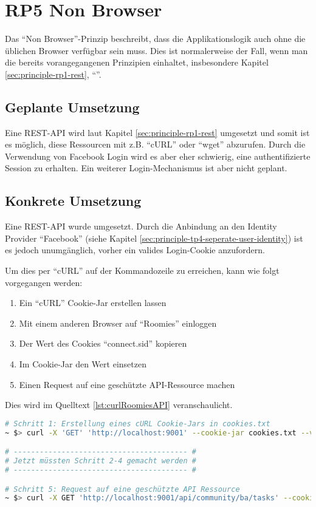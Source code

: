 \section{RP5 Non Browser}
\label{sec:principle-rp5-non-browser}

Das ``Non Browser''-Prinzip beschreibt, dass die Applikationslogik auch ohne die üblichen Browser verfügbar sein muss. Dies ist normalerweise der Fall, wenn man die bereits vorangegangenen Prinzipien einhaltet, insbesondere Kapitel \ref{sec:principle-rp1-rest}, ``''.

\subsection*{Geplante Umsetzung}
Eine REST-API wird laut Kapitel \ref{sec:principle-rp1-rest} umgesetzt und somit ist es möglich, diese Ressourcen mit z.B. ``cURL'' \cite{curl} oder ``wget'' \cite{wget} abzurufen.
Durch die Verwendung von Facebook Login wird es aber eher schwierig, eine authentifizierte Session zu erhalten. Ein weiterer Login-Mechanismus ist aber nicht geplant.

\subsection*{Konkrete Umsetzung}
Eine REST-API wurde umgesetzt. Durch die Anbindung an den Identity Provider ``Facebook'' (siehe Kapitel \ref{sec:principle-tp4-seperate-user-identity}) ist es jedoch unumgänglich, vorher ein valides Login-Cookie anzufordern.

Um dies per ``cURL'' auf der Kommandozeile zu erreichen, kann wie folgt vorgegangen werden:
\begin{enumerate}
	\item Ein ``cURL'' Cookie-Jar erstellen lassen
	\item Mit einem anderen Browser auf ``Roomies'' einloggen
	\item Der Wert des Cookies ``connect.sid'' kopieren
	\item Im Cookie-Jar den Wert einsetzen
	\item Einen Request auf eine geschützte API-Ressource machen
\end{enumerate}

Dies wird im Quelltext \ref{lst:curlRoomiesAPI} veranschaulicht.

\begin{lstlisting}[language=Bash, caption=cURL Request auf Roomies, label=curlRoomiesAPI]
# Schritt 1: Erstellung eines cURL Cookie-Jars in cookies.txt
~ $> curl -X 'GET' 'http://localhost:9001' --cookie-jar cookies.txt --verbose --location

# ---------------------------------------- #
# Jetzt müssten Schritt 2-4 gemacht werden #
# ---------------------------------------- #

# Schritt 5: Request auf eine geschützte API Ressource
~ $> curl -X GET 'http://localhost:9001/api/community/ba/tasks' --cookie cookies.txt  --verbose --location
\end{lstlisting}

